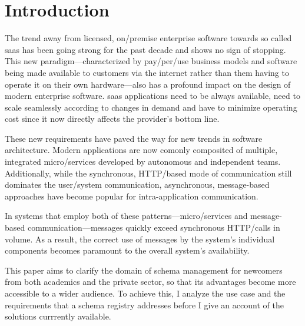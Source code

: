 
\section{Introduction}\label{sec:introduction}



The trend away from licensed, on\-/premise enterprise software towards so called \gls{saas} has been going strong for the past decade and shows no sign of stopping.
This new paradigm---characterized by pay\-/per\-/use business models and software being made available to customers via the internet rather than them having to operate it on their own hardware---also has a profound impact on the design of modern enterprise software.
\gls{saas} applications need to be always available, need to scale seamlessly according to changes in demand and have to minimize operating cost since it now directly affects the provider's bottom line.

These new requirements have paved the way for new trends in software architecture.
Modern applications are now comonly composited of multiple, integrated micro\-/services developed by autonomous and independent teams.
Additionally, while the synchronous, HTTP\-/based mode of communication still dominates the user\-/system communication, asynchronous, message-based approaches have become popular for intra-application communication.

In systems that employ both of these patterns---micro\-/services and message-based communication---messages quickly exceed synchronous HTTP\-/calls in volume.
As a result, the correct use of messages by the system's individual components becomes paramount to the overall system's availability.





This paper aims to clarify the domain of schema management for newcomers from both academics and the private sector, so that its advantages become more accessible to a wider audience. To achieve this, I analyze the use case and the requirements that a schema registry addresses before I give an account of the solutions currrently available.

